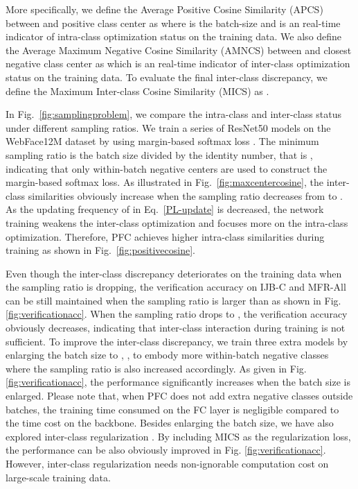 \documentclass[10pt,twocolumn,letterpaper]{article}
\begin{document}
More specifically, we define the Average Positive Cosine Similarity (APCS) between  and positive class center  as  
where  is the batch-size and  is an real-time indicator of intra-class optimization status on the training data. 
We also define the Average Maximum Negative Cosine Similarity (AMNCS) between  and closest negative class center  as 
which is an real-time indicator of inter-class optimization status on the training data. To evaluate the final inter-class discrepancy, we define the Maximum Inter-class Cosine Similarity (MICS) as .

In Fig.~\ref{fig:samplingproblem}, we compare the intra-class and inter-class status under different sampling ratios. We train a series of ResNet50 models on the WebFace12M dataset \cite{zhu2021webface260m} by using margin-based softmax loss \cite{tencent2018CosineFace,deng2019arcface}. The minimum sampling ratio is the batch size divided by the identity number, that is , indicating that only within-batch negative centers are used to construct the margin-based softmax loss. 
As illustrated in Fig.~\ref{fig:maxcentercosine}, the inter-class similarities obviously increase when the sampling ratio decreases from  to . As the updating frequency of  in Eq.~\ref{PL-update} is decreased, the network training weakens the inter-class optimization and focuses more on the intra-class optimization. Therefore, PFC achieves higher intra-class similarities during training as shown in Fig.~\ref{fig:positivecosine}. 

Even though the inter-class discrepancy deteriorates on the training data when the sampling ratio is dropping, the verification accuracy on IJB-C \cite{maze2018iarpa} and MFR-All \cite{deng2021mfrinsightface} can be still maintained when the sampling ratio is larger than  as shown in Fig. \ref{fig:verificationacc}. When the sampling ratio drops to , the verification accuracy obviously decreases, indicating that inter-class interaction during training is not sufficient. To improve the inter-class discrepancy, we train three extra models by enlarging the batch size to , ,  to embody more within-batch negative classes where the sampling ratio is also increased accordingly. As given in Fig. \ref{fig:verificationacc}, the performance significantly increases when the batch size is enlarged. Please note that, when PFC does not add extra negative classes outside batches, the training time consumed on the FC layer is negligible compared to the time cost on the backbone. Besides enlarging the batch size, we have also explored inter-class regularization \cite{zhao2019regularface}. By including MICS as the regularization loss, the performance can be also obviously improved in Fig. \ref{fig:verificationacc}. However, inter-class regularization needs non-ignorable computation cost on large-scale training data.
\end{document}
